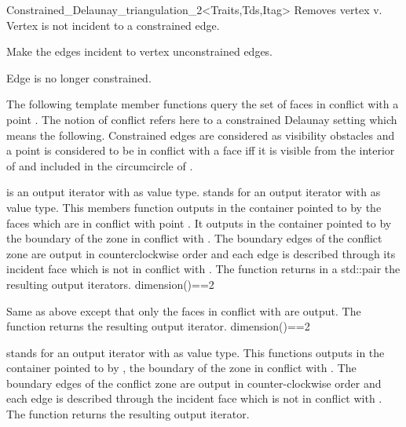 \begin{ccRefClass}{Constrained_Delaunay_triangulation_2<Traits,Tds,Itag>}
{ Removes vertex v. 
\ccPrecond Vertex   is not incident to a constrained edge.}

{Make the edges incident to vertex  unconstrained edges.}

{ Edge   is no longer constrained.}


The following template member functions query the
set of faces in conflict with a point .
The notion of conflict refers here to a 
constrained Delaunay setting which means the following.
Constrained edges are considered as visibility obstacles
and a point  is considered to be 
in conflict with a face  iff it is 
 visible from the interior of  and 
included in the circumcircle of .

{  is an output iterator with  as value type.
 stands for an output iterator with  as value type.
This members function outputs in the container pointed to by 
the faces which are in conflict with point .
It outputs in the container pointed to by  
the boundary of the zone in conflict with .
The boundary edges
of the conflict  zone are output in counterclockwise order
and each edge is described  through its incident face
which is not in conflict with .
The function returns in a std::pair the resulting output iterators.
\ccPrecond dimension()==2}

{Same as above except that only the faces in conflict with 
are output. The function returns the resulting output iterator.
\ccPrecond dimension()==2}

{  stands for an output iterator with 
 as value
type.
 This functions  outputs in the container pointed to by ,
the boundary of the zone in conflict with . The boundary edges
of the conflict  zone are output in counter-clockwise order
and each edge is described  through the incident face
which is not in conflict with .
The function returns the resulting output iterator.}



\end{ccRefClass}
